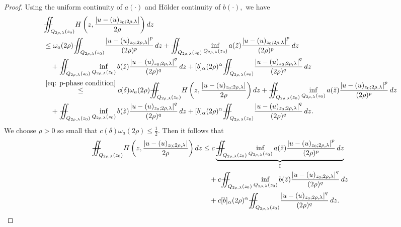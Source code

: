 \documentclass[11pt,oneside, english,reqno,twoside a4paper]{amsart}
\theoremstyle{definition}
\numberwithin{theorem}{section}
\numberwithin{equation}{section}
\newcommand{\iintss}{{\int\hspace{-0.28cm}\int}}
\newcommand{ \miints }{{\iintss\hspace{-0.56cm} -\hspace{-0.15cm}-}}
\newcommand{\miint}[1]{{\miints_{\hspace{-0.13cm}#1}}}
\begin{document}
\begin{proof}
 Using the uniform continuity of $a(\cdot)$ and H\"{o}lder continuity of $b(\cdot), $ we have
\begin{align*}
&\miint{Q_{2 \rho,\lambda}\left(z_0\right)} H\left(z,\frac{\left|u-(u)_{z_0 ; 2 \rho,\lambda}\right|}{2 \rho}\right) dz\\
&\leq \omega_a(2\rho)\miint{Q_{2 \rho,\lambda}\left(z_0\right)}\frac{\left|u-(u)_{z_0 ; 2 \rho,\lambda}\right|^p}{(2 \rho)^p}\, dz + \miint{Q_{2 \rho,\lambda}\left(z_0\right)} \inf_{Q_{2 \rho,\lambda}\left(z_0\right)} a(\tilde{z}) \frac{\left|u-(u)_{z_0 ; 2 \rho,\lambda}\right|^p}{(2 \rho)^p}\, dz\\
&\quad + \miint{Q_{2 \rho,\lambda}\left(z_0\right)} \inf_{Q_{2 \rho,\lambda}\left(z_0\right)} b(\tilde{z})\frac{\left|u-(u)_{z_0 ; 2 \rho,\lambda}\right|^q}{(2 \rho)^q}\, dz +[b]_{\alpha}(2\rho)^{\alpha}\miint{Q_{2 \rho,\lambda}\left(z_0\right)}\frac{\left|u-(u)_{z_0 ; 2 \rho,\lambda}\right|^q}{(2 \rho)^q}\, dz\\
&\overset{\eqref{eq: p-phase condition}}{\leq} c(\delta)\omega_a(2\rho)\miint{Q_{2 \rho,\lambda}\left(z_0\right)} H\left(z,\frac{\left|u-(u)_{z_0 ; 2 \rho,\lambda}\right|}{2 \rho}\right) dz + \miint{Q_{2 \rho,\lambda}\left(z_0\right)} \inf_{Q_{2 \rho,\lambda}\left(z_0\right)} a(\tilde{z}) \frac{\left|u-(u)_{z_0 ; 2 \rho,\lambda}\right|^p}{(2 \rho)^p}\, dz\\
&\quad + \miint{Q_{2 \rho,\lambda}\left(z_0\right)} \inf_{Q_{2 \rho,\lambda}\left(z_0\right)} b(\tilde{z})\frac{\left|u-(u)_{z_0 ; 2 \rho,\lambda}\right|^q}{(2 \rho)^q}\, dz +[b]_{\alpha}(2\rho)^{\alpha}\miint{Q_{2 \rho,\lambda}\left(z_0\right)}\frac{\left|u-(u)_{z_0 ; 2 \rho,\lambda}\right|^q}{(2 \rho)^q}\, dz.
\end{align*}
We choose $\rho>0$ so small that $c(\delta)\omega_a(2\rho)\leq \frac{1}{2}$.
Then it follows that
\begin{align*}
\miint{Q_{2 \rho,\lambda}\left(z_0\right)} H\left(z,\frac{\left|u-(u)_{z_0 ; 2 \rho,\lambda}\right|}{2 \rho}\right) dz &\leq c \underbrace{\miint{Q_{2 \rho,\lambda}\left(z_0\right)} \inf_{Q_{2 \rho,\lambda}\left(z_0\right)} a(\tilde{z}) \frac{\left|u-(u)_{z_0 ; 2 \rho,\lambda}\right|^p}{(2 \rho)^p}\, dz}_{\mathrm{I}}\\
&\quad +c\miint{Q_{2 \rho,\lambda}\left(z_0\right)} \inf_{Q_{2 \rho,\lambda}\left(z_0\right)} b(\tilde{z})\frac{\left|u-(u)_{z_0 ; 2 \rho,\lambda}\right|^q}{(2 \rho)^q}\, dz\\
&\quad +c[b]_{\alpha}(2\rho)^{\alpha}\miint{Q_{2 \rho,\lambda}\left(z_0\right)}\frac{\left|u-(u)_{z_0 ; 2 \rho,\lambda}\right|^q}{(2 \rho)^q}\, dz.

\end{align*}
\end{proof}
\end{document}
